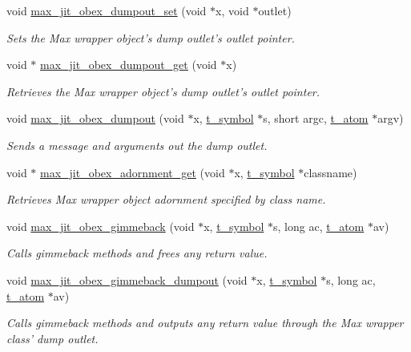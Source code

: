 \begin{DoxyCompactItemize}
void \hyperlink{group__maxwrapmod_ga8e63a402ecf8cef78a9093c774159a9e}{max\_\-jit\_\-obex\_\-dumpout\_\-set} (void $\ast$x, void $\ast$outlet)
\begin{DoxyCompactList}\small\item\em Sets the Max wrapper object's dump outlet's outlet pointer. \item\end{DoxyCompactList}\item 
void $\ast$ \hyperlink{group__maxwrapmod_gae0f179c644d50a572a7c159db83490a5}{max\_\-jit\_\-obex\_\-dumpout\_\-get} (void $\ast$x)
\begin{DoxyCompactList}\small\item\em Retrieves the Max wrapper object's dump outlet's outlet pointer. \item\end{DoxyCompactList}\item 
void \hyperlink{group__maxwrapmod_ga161cd54f4612d26057e4140b56e14729}{max\_\-jit\_\-obex\_\-dumpout} (void $\ast$x, \hyperlink{structt__symbol}{t\_\-symbol} $\ast$s, short argc, \hyperlink{structt__atom}{t\_\-atom} $\ast$argv)
\begin{DoxyCompactList}\small\item\em Sends a message and arguments out the dump outlet. \item\end{DoxyCompactList}\item 
void $\ast$ \hyperlink{group__maxwrapmod_gae32503dc254a4f5fc1fb73fa0d7e0144}{max\_\-jit\_\-obex\_\-adornment\_\-get} (void $\ast$x, \hyperlink{structt__symbol}{t\_\-symbol} $\ast$classname)
\begin{DoxyCompactList}\small\item\em Retrieves Max wrapper object adornment specified by class name. \item\end{DoxyCompactList}\item 
void \hyperlink{group__maxwrapmod_gabebaedc41e3bfef6f84d3752f619d045}{max\_\-jit\_\-obex\_\-gimmeback} (void $\ast$x, \hyperlink{structt__symbol}{t\_\-symbol} $\ast$s, long ac, \hyperlink{structt__atom}{t\_\-atom} $\ast$av)
\begin{DoxyCompactList}\small\item\em Calls gimmeback methods and frees any return value. \item\end{DoxyCompactList}\item 
void \hyperlink{group__maxwrapmod_ga9afabd186c3db8a6b4689eae00171bcd}{max\_\-jit\_\-obex\_\-gimmeback\_\-dumpout} (void $\ast$x, \hyperlink{structt__symbol}{t\_\-symbol} $\ast$s, long ac, \hyperlink{structt__atom}{t\_\-atom} $\ast$av)
\begin{DoxyCompactList}\small\item\em Calls gimmeback methods and outputs any return value through the Max wrapper class' dump outlet. \item\end{DoxyCompactList}\end{DoxyCompactItemize}


